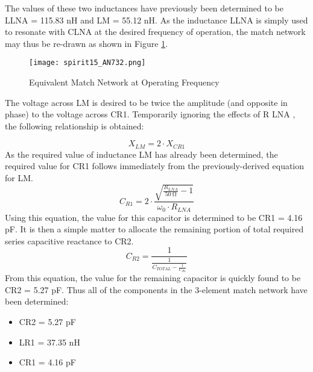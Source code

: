         The values of these two inductances have previously been determined to be LLNA = 115.83 nH 
        and LM = 55.12 nH. As the inductance LLNA is simply used to resonate with CLNA at the 
        desired frequency of operation, the match network may thus be re-drawn as shown in Figure 
        \ref{EXP001:fig_spirit15}.

        \begin{figure}[ht!] %
          \centering
          \texttt{[image: spirit15\_AN732.png]}
          \caption{Equivalent Match Network at Operating Frequency \cite[s.~10]{AN643SiliconLabs}}
          \label{EXP001:fig_spirit15}
        \end{figure}
        
        The voltage across LM is desired to be twice the amplitude (and opposite in phase) to the 
        voltage across CR1. Temporarily ignoring the effects of R LNA , the following relationship 
        is obtained:
        
        \begin{equation}\label{EXP001:eq_spirit16}
         X_{LM} = 2\cdot X_{CR1}
        \end{equation}
        As the required value of inductance LM has already been determined, the required value for 
        CR1 follows immediately from the previously-derived equation for LM.
        \begin{equation}\label{EXP001:eq_spirit17}
          C_{R1} = 2\cdot\frac{\sqrt{\frac{R_{LNA}}{\SI{50}{\ohm}}-1}}{\omega_0\cdot R_{LNA}}
        \end{equation}
        Using this equation, the value for this capacitor is determined to be CR1 = 4.16 pF. It is 
        then a simple matter to allocate the remaining portion of total required series capacitive 
        reactance to CR2.
        \begin{equation}\label{EXP001:eq_spirit18}
          C_{R2} = \frac{1}{\frac{1}{C_{TOTAL}-\frac{1}{C_{R1}}}}
        \end{equation}
        From this equation, the value for the remaining capacitor is quickly found to be CR2 = 5.27 
        pF. Thus all of the components in the 3-element match network have been determined:
        \begin{itemize}[noitemsep]
          \item CR2 = 5.27 pF
          \item LR1 = 37.35 nH
          \item CR1 = 4.16 pF
        \end{itemize}
        
